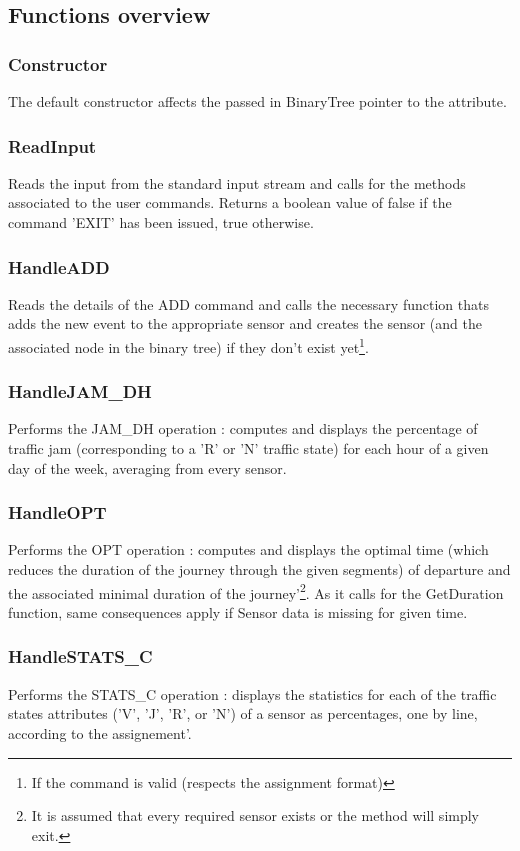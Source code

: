 \documentclass[10pt]{article}
\begin{document}
\subsection{Functions overview}

\subsubsection*{Constructor}
The default constructor affects the passed in BinaryTree pointer to the attribute.

\subsubsection*{ReadInput}
Reads the input from the standard input stream and calls for the methods associated to the user commands. Returns a boolean value of false if the command 'EXIT' has been issued, true otherwise.

\subsubsection*{HandleADD}
Reads the details of the ADD command and calls the necessary function thats adds the new event to the appropriate sensor and creates the sensor (and the associated node in the binary tree) if they don't exist yet\footnote{ If the command is valid (respects the assignment format)}.

\subsubsection*{HandleJAM\_DH}
Performs the JAM\_DH operation : computes and displays the percentage of traffic jam (corresponding to a 'R' or 'N' traffic state) for each hour of a given day of the week, averaging from every sensor\footnotemark[2].

\subsubsection*{HandleOPT}
Performs the OPT operation : computes and displays the optimal time (which reduces the duration of the journey through the given segments) of departure and the associated minimal duration of the journey\footnotemark[2]'\footnote{ It is assumed that every required sensor exists or the method will simply exit.}. As it calls for the GetDuration function, same consequences apply if Sensor data is missing for given time.

\subsubsection*{HandleSTATS\_C}
Performs the STATS\_C operation : displays the statistics for each of the traffic states attributes ('V', 'J', 'R', or 'N') of a sensor as percentages, one by line, according to the assignement\footnotemark[2]'\footnotemark[3].
\end{document}
